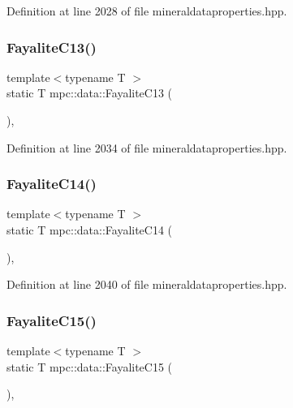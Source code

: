Definition at line 2028 of file mineraldataproperties.\+hpp.

\mbox{\label{namespacempc_1_1data_adc1323c9ebd8312fb76e3b08aecbf26d}} 
\subsubsection{\texorpdfstring{Fayalite\+C13()}{FayaliteC13()}}
{\footnotesize\ttfamily template$<$typename T $>$ \\
static T mpc\+::data\+::\+Fayalite\+C13 (\begin{DoxyParamCaption}{ }\end{DoxyParamCaption})\hspace{0.3cm}{\ttfamily [inline]}, {\ttfamily [static]}}



Definition at line 2034 of file mineraldataproperties.\+hpp.

\mbox{\label{namespacempc_1_1data_a3463f0c7c97eeb5a56e312c661d7060f}} 
\subsubsection{\texorpdfstring{Fayalite\+C14()}{FayaliteC14()}}
{\footnotesize\ttfamily template$<$typename T $>$ \\
static T mpc\+::data\+::\+Fayalite\+C14 (\begin{DoxyParamCaption}{ }\end{DoxyParamCaption})\hspace{0.3cm}{\ttfamily [inline]}, {\ttfamily [static]}}



Definition at line 2040 of file mineraldataproperties.\+hpp.

\mbox{\label{namespacempc_1_1data_ab6a79b00b7bdc98776866eceff149b06}} 
\subsubsection{\texorpdfstring{Fayalite\+C15()}{FayaliteC15()}}
{\footnotesize\ttfamily template$<$typename T $>$ \\
static T mpc\+::data\+::\+Fayalite\+C15 (\begin{DoxyParamCaption}{ }\end{DoxyParamCaption})\hspace{0.3cm}{\ttfamily [inline]}, {\ttfamily [static]}}



